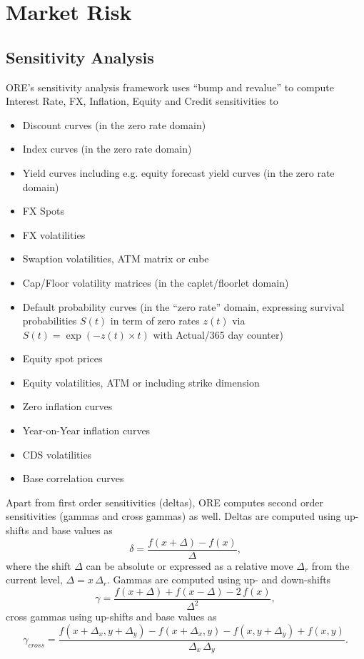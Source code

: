 \chapter{Market Risk}

\section{Sensitivity Analysis}\label{sec:app_sensi}

ORE's sensitivity analysis framework uses ``bump and revalue'' to compute Interest Rate, FX, Inflation, Equity and Credit sensitivities to
\begin{itemize}
\item Discount curves  (in the zero rate domain)
\item Index curves (in the zero rate domain)
\item Yield curves including e.g. equity forecast yield curves (in the zero rate domain)
\item FX Spots
\item FX volatilities
\item Swaption volatilities, ATM matrix or cube
\item Cap/Floor volatility matrices (in the caplet/floorlet domain)
\item Default probability curves (in the ``zero rate'' domain, expressing survival probabilities $S(t)$ in term of zero rates $z(t)$ via $S(t)=\exp(-z(t)\times t)$ with Actual/365 day counter)
\item Equity spot prices
\item Equity volatilities, ATM or including strike dimension
\item Zero inflation curves
\item Year-on-Year inflation curves
\item CDS volatilities
\item Base correlation curves
\end{itemize}

Apart from first order sensitivities (deltas), ORE computes second order sensitivities (gammas and cross gammas) as well. Deltas are computed using up-shifts and base values as
$$
\delta = \frac{f(x+\Delta)-f(x)}{\Delta},
$$
where the shift $\Delta$ can be absolute or expressed as a relative move $\Delta_r$ from the current level, $\Delta=x\,\Delta_r$. Gammas are computed using up- and down-shifts
$$
\gamma = \frac{f(x+\Delta)+f(x-\Delta) - 2\,f(x)}{\Delta^2},
$$
cross gammas using up-shifts and base values as
$$
\gamma_{cross} = \frac{f(x+\Delta_x,y+\Delta_y)-f(x+\Delta_x,y) -f(x,y+\Delta_y) + f(x,y)}{\Delta_x\,\Delta_y}.
$$

